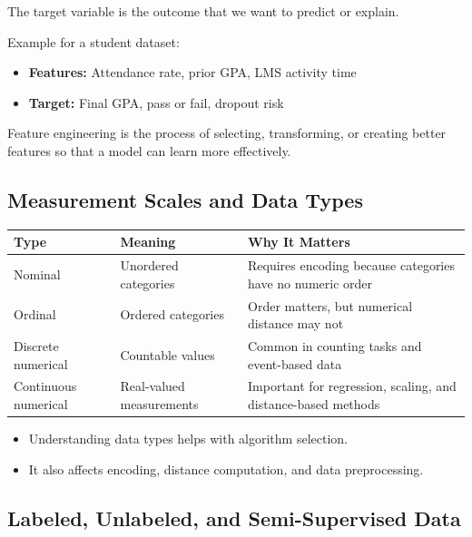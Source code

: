 \documentclass[11pt,a4paper]{article}
\begin{document}
\begin{definitionbox}
The target variable is the outcome that we want to predict or explain.
\end{definitionbox}

Example for a student dataset:
\begin{itemize}[leftmargin=*]
  \item \textbf{Features:} Attendance rate, prior GPA, LMS activity time
  \item \textbf{Target:} Final GPA, pass or fail, dropout risk
\end{itemize}

\begin{conceptbox}
Feature engineering is the process of selecting, transforming, or creating better features so that a model can learn more effectively.
\end{conceptbox}

\subsection{Measurement Scales and Data Types}

\begin{longtable}{@{}p{3.0cm}p{3.6cm}p{6.9cm}@{}}
\toprule
\rowcolor{primary!15}
\textbf{Type} & \textbf{Meaning} & \textbf{Why It Matters} \\
\midrule
\endhead
Nominal & Unordered categories & Requires encoding because categories have no numeric order \\
\addlinespace
Ordinal & Ordered categories & Order matters, but numerical distance may not \\
\addlinespace
Discrete numerical & Countable values & Common in counting tasks and event-based data \\
\addlinespace
Continuous numerical & Real-valued measurements & Important for regression, scaling, and distance-based methods \\
\bottomrule
\end{longtable}

\begin{itemize}[leftmargin=*]
  \item Understanding data types helps with algorithm selection.
  \item It also affects encoding, distance computation, and data preprocessing.
\end{itemize}

\subsection{Labeled, Unlabeled, and Semi-Supervised Data}
\end{document}
